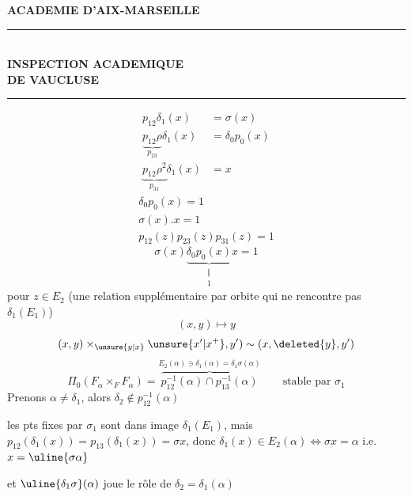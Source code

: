 
\textbf{ACADEMIE D'AIX-MARSEILLE}\\
\rule{3cm}{.4pt}\\
\textbf{INSPECTION ACADEMIQUE}\\
\textbf{DE VAUCLUSE}\\
\rule{1cm}{.4pt}
\[\begin{aligned}
p_{12}\delta_1(x)&=\sigma(x)\\
\underbrace{p_{12}\rho}_{p_{23}}\delta_1(x)&=\delta_0p_0(x)\\
\underbrace{p_{12}\rho^2}_{p_{31}}\delta_1(x)&=x
\end{aligned}\]
\[\boxed{\begin{gathered}
\delta_0p_0(x)=1\\
\sigma(x).x=1\\[.5em]
p_{12}(z)p_{23}(z)p_{31}(z)=1
\end{gathered}}\]
\[\sigma(x)\underbrace{\delta_0p_0(x)}_{\substack{\Vert\\1}}x=1\]
pour $z\in E_2$ (une relation  supplémentaire par orbite  qui ne rencontre pas $\delta_1(E_1)$)
\[(x,y)\mapsto y\]
\[(x,y)\times_{\unsure{y|x}}\unsure{x'|x^+},y')\sim(x,\deleted{y},y')\]
\[\Pi_0(F_\alpha\times_F F_\alpha)=\overbrace{p_{12}^{-1}(\alpha)\cap p_{13}^{-1}(\alpha)}^{E_2(\alpha)\ni\delta_1(\alpha)=\delta_1\sigma(\alpha)}\qquad\text{stable par }\sigma_1\]
Prenons $\alpha\ne\delta_1$, alors $\delta_2\notin p_{12}^{-1}(\alpha)$

les pts fixes par $\sigma_1$ sont dans image $\delta_1(E_1)$, mais $p_{12}(\delta_1(x))=p_{13}(\delta_1(x))=\sigma x$, donc 
 $\delta_1(x)\in E_2(\alpha)\Longleftrightarrow\sigma x=\alpha$ i.e. $x=\uline{\sigma\alpha}$

et $\uline{\delta_1\sigma}(\alpha)$ joue le rôle de $\delta_2=\delta_1(\alpha)$
